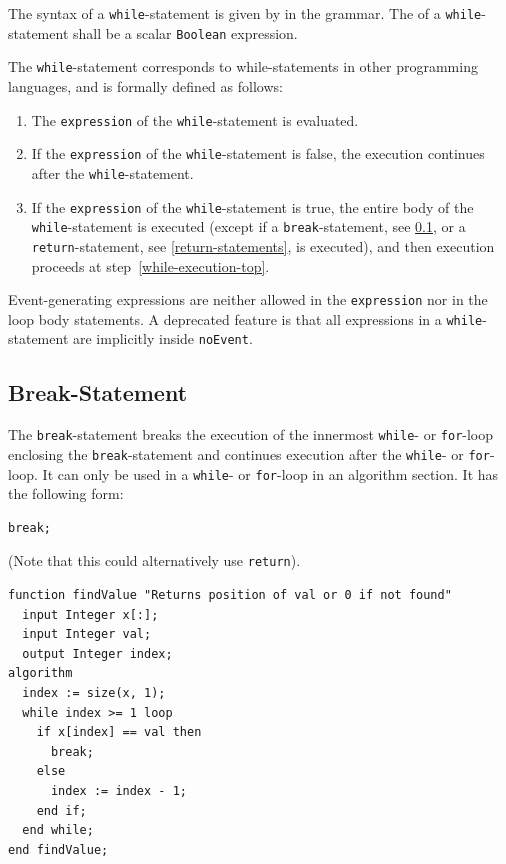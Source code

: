 The syntax of a \lstinline!while!-statement is given by  in the grammar.
The  of a \lstinline!while!-statement shall be a scalar \lstinline!Boolean! expression.

The \lstinline!while!-statement corresponds to while-statements in other programming languages, and is formally defined as follows:
\begin{enumerate}
\item
  \label{while-execution-top}
  The \lstinline!expression! of the \lstinline!while!-statement is evaluated.
\item
  If the \lstinline!expression! of the \lstinline!while!-statement is false, the execution continues after the \lstinline!while!-statement.
\item
  If the \lstinline!expression! of the \lstinline!while!-statement is true, the entire body of the \lstinline!while!-statement is executed (except if a \lstinline!break!-statement, see \cref{break-statement}, or a \lstinline!return!-statement, see \cref{return-statements}, is executed), and then execution proceeds at step~\ref{while-execution-top}.
\end{enumerate}

Event-generating expressions are neither allowed in the \lstinline!expression! nor in the loop body statements.
A deprecated feature is that all expressions in a \lstinline!while!-statement are implicitly inside \lstinline!noEvent!.


\subsection{Break-Statement}\label{break-statement}

The \lstinline!break!-statement breaks the execution of the innermost \lstinline!while!- or \lstinline!for!-loop enclosing the \lstinline!break!-statement and continues execution after the \lstinline!while!- or \lstinline!for!-loop.
It can only be used in a \lstinline!while!- or \lstinline!for!-loop in an algorithm section.
It has the following form:
\begin{lstlisting}[language=modelica]
break;
\end{lstlisting}

\begin{example}
(Note that this could alternatively use \lstinline!return!).
\begin{lstlisting}[language=modelica]
function findValue "Returns position of val or 0 if not found"
  input Integer x[:];
  input Integer val;
  output Integer index;
algorithm
  index := size(x, 1);
  while index >= 1 loop
    if x[index] == val then
      break;
    else
      index := index - 1;
    end if;
  end while;
end findValue;
\end{lstlisting}
\end{example}


